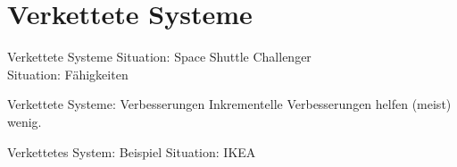 \section{Verkettete Systeme}


\begin{frame}[c]{Verkettete Systeme}
    \Large
    Situation: Space Shuttle Challenger \\
    \pause
    Situation: Fähigkeiten
\end{frame}


\begin{frame}[c]{Verkettete Systeme: Verbesserungen}
    \large
    Inkrementelle Verbesserungen helfen (meist) wenig.
\end{frame}


\begin{frame}[c]{Verkettetes System: Beispiel}
    \Large
    Situation: IKEA
\end{frame}




